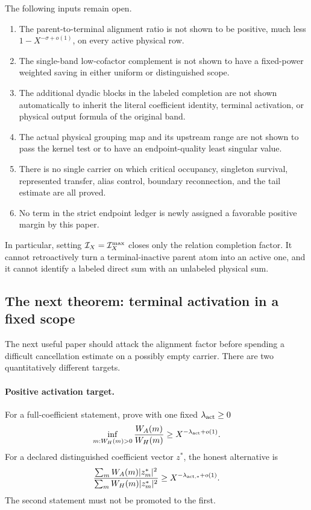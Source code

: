 The following inputs remain open.
\begin{enumerate}[leftmargin=2.3em]
 \item The parent-to-terminal alignment ratio is not shown to be positive,
       much less \(1-X^{-\sigma+o(1)}\), on every active physical row.
 \item The single-band low-cofactor complement is not shown to have a
       fixed-power weighted saving in either uniform or distinguished
       scope.
 \item The additional dyadic blocks in the labeled completion are not
       shown automatically to inherit the literal coefficient identity,
       terminal activation, or physical output formula of the original
       band.
 \item The actual physical grouping map and its upstream range are not
       shown to pass the kernel test or to have an endpoint-quality least
       singular value.
 \item There is no single carrier on which critical occupancy, singleton
       survival, represented transfer, alias control, boundary
       reconnection, and the tail estimate are all proved.
 \item No term in the strict endpoint ledger is newly assigned a favorable
       positive margin by this paper.
\end{enumerate}

In particular, setting \(\mathcal I_X=\mathcal I_X^{\max}\) closes only the relation
completion factor.  It cannot retroactively turn a terminal-inactive
parent atom into an active one, and it cannot identify a labeled direct
sum with an unlabeled physical sum.

\subsection{The next theorem: terminal activation in a fixed scope}

The next useful paper should attack the alignment factor before spending a
difficult cancellation estimate on a possibly empty carrier.  There are
two quantitatively different targets.

\paragraph{Positive activation target.}
For a full-coefficient statement, prove with one fixed
\(\lambda_{\rm act}\ge0\)
\begin{equation}
 \inf_{m:W_H(m)>0}\frac{W_A(m)}{W_H(m)}
 \ge X^{-\lambda_{\rm act}+o(1)}.
 \label{eq:tpc63-next-positive-activation}
\end{equation}
For a declared distinguished coefficient vector \(z^*\), the honest
alternative is
\begin{equation}
 \frac{\sum_mW_A(m)|z_m^*|^2}
      {\sum_mW_H(m)|z_m^*|^2}
 \ge X^{-\lambda_{\rm act,*}+o(1)}.
 \label{eq:tpc63-next-distinguished-activation}
\end{equation}
The second statement must not be promoted to the first.

